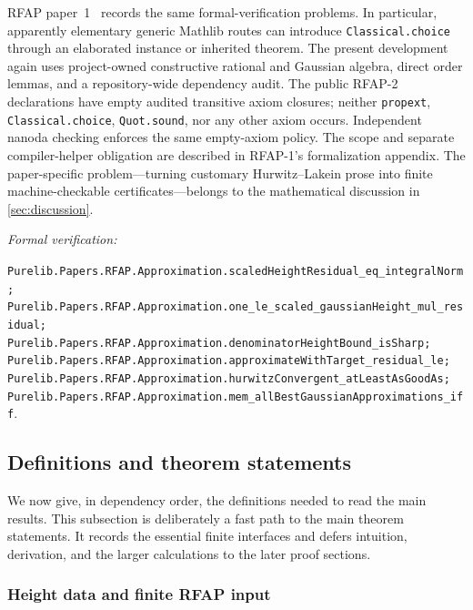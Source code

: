 \documentclass[11pt]{article}
\newcommand{\leanref}[1]{\par\smallskip\noindent
  \emph{Formal verification:}\par\nobreak
  {\raggedright\nolinkurl{#1}.\par}}
\begin{document}
RFAP paper~1~\cite{RFAPOne} records the same formal-verification problems.
In particular, apparently elementary generic Mathlib routes can introduce
\texttt{Classical.choice} through an elaborated instance or inherited
theorem.  The present development again uses project-owned constructive
rational and Gaussian algebra, direct order lemmas, and a repository-wide
dependency audit.  The public RFAP-2 declarations have empty audited
transitive axiom closures; neither \texttt{propext},
\texttt{Classical.choice}, \texttt{Quot.sound}, nor any other axiom occurs.
Independent nanoda checking enforces the same empty-axiom policy.
The scope and separate compiler-helper obligation are described in RFAP-1's
formalization appendix.  The
paper-specific problem---turning customary Hurwitz--Lakein prose into finite
machine-checkable certificates---belongs to the mathematical discussion in
\cref{sec:discussion}.

\leanref{Purelib.Papers.RFAP.Approximation.scaledHeightResidual_eq_integralNorm;
Purelib.Papers.RFAP.Approximation.one_le_scaled_gaussianHeight_mul_residual;
Purelib.Papers.RFAP.Approximation.denominatorHeightBound_isSharp;
Purelib.Papers.RFAP.Approximation.approximateWithTarget_residual_le;
Purelib.Papers.RFAP.Approximation.hurwitzConvergent_atLeastAsGoodAs;
Purelib.Papers.RFAP.Approximation.mem_allBestGaussianApproximations_iff}

\subsection{Definitions and theorem statements}
\label{sec:statements}

We now give, in dependency order, the definitions needed to read the main
results.  This subsection is deliberately a fast path to the main theorem
statements.  It records the essential finite interfaces and defers intuition,
derivation, and the larger calculations to the later proof sections.

\subsubsection{Height data and finite RFAP input}
\end{document}
